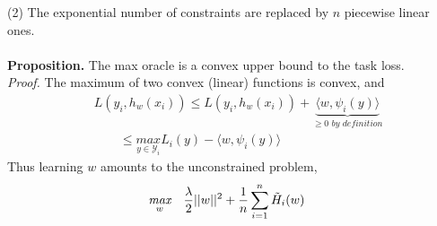 \documentclass{article}
\begin{document}
(2) The exponential number of constraints are replaced by $n$ piecewise linear ones.
\\
\\
\textbf{Proposition.} The max oracle is a convex upper bound to the task loss.\\
\textit{Proof.} The maximum of two convex (linear) functions is convex, and
\begin{equation*}
\begin{aligned}
    &L(y_{i},h_{w}(x_{i})) \leq L(y_{i},h_{w}(x_{i})) + \underbrace{\langle w, \psi_{i}(y)\rangle}_{\geq 0 \textit{ by definition}} \\
    &\quad\quad\leq \underset{y\in\mathcal{Y}_{i}}{\textit{max}} L_{i}(y)- \langle w, \psi_{i}(y)\rangle
\end{aligned}
\end{equation*}
Thus learning $w$ amounts to the unconstrained problem,
\begin{equation*}
\begin{aligned}
    &\underset{w}{\textit{max}}\quad\frac{\lambda}{2}||w||^{2}+ \frac{1}{n}\sum_{i=1}^{n}\Tilde{H}_{i}(w)
\end{aligned}
\end{equation*}
\end{document}

